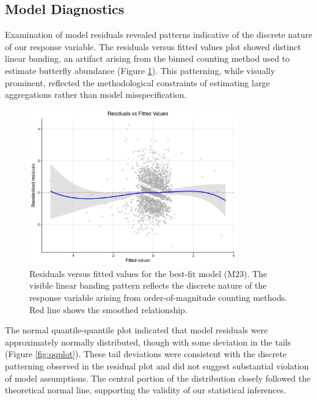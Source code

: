 \subsection{Model Diagnostics}

Examination of model residuals revealed patterns indicative of the discrete nature of our response variable. The residuals versus fitted values plot showed distinct linear banding, an artifact arising from the binned counting method used to estimate butterfly abundance (Figure \ref{fig:residuals}). This patterning, while visually prominent, reflected the methodological constraints of estimating large aggregations rather than model misspecification.

\begin{figure}[htbp]
\centering
\includegraphics[width=0.8\textwidth]{supplemental/results/thesis_exports/figures/residuals_vs_fitted.png}
\caption{Residuals versus fitted values for the best-fit model (M23). The visible linear banding pattern reflects the discrete nature of the response variable arising from order-of-magnitude counting methods. Red line shows the smoothed relationship.}
\label{fig:residuals}
\end{figure}

The normal quantile-quantile plot indicated that model residuals were approximately normally distributed, though with some deviation in the tails (Figure \ref{fig:qqplot}). These tail deviations were consistent with the discrete patterning observed in the residual plot and did not suggest substantial violation of model assumptions. The central portion of the distribution closely followed the theoretical normal line, supporting the validity of our statistical inferences.

